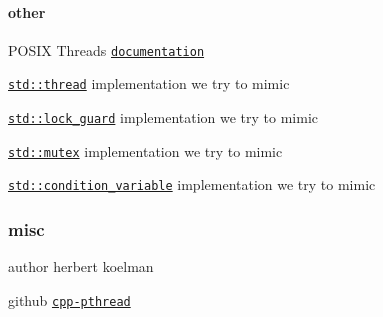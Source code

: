 \paragraph*{other}


\begin{DoxyItemize}
\item P\+O\+S\+IX Threads \href{http://pubs.opengroup.org/onlinepubs/007908799/xsh/threads.html}{\tt documentation}
\item \href{http://en.cppreference.com/w/cpp/thread/thread}{\tt std\+::thread} implementation we try to mimic
\item \href{http://en.cppreference.com/w/cpp/thread/lock_guard/lock_guard}{\tt std\+::lock\+\_\+guard} implementation we try to mimic
\item \href{http://en.cppreference.com/w/cpp/thread/mutex}{\tt std\+::mutex} implementation we try to mimic
\item \href{http://en.cppreference.com/w/cpp/thread/condition_variable}{\tt std\+::condition\+\_\+variable} implementation we try to mimic
\end{DoxyItemize}

\subsubsection*{misc}


\begin{DoxyItemize}
\item author herbert koelman
\item github \href{https://github.com/HerbertKoelman/cpp-pthread}{\tt cpp-\/pthread} 
\end{DoxyItemize}